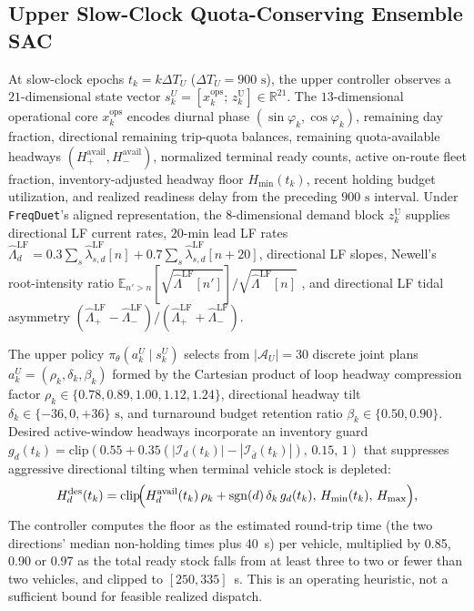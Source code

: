 \subsection{Upper Slow-Clock Quota-Conserving Ensemble SAC}
\label{sec:method_upper}

At slow-clock epochs $t_k = k \Delta T_U$ ($\Delta T_U = 900\text{ s}$), the upper controller observes a $21$-dimensional state vector $s^U_k = [x^{\mathrm{ops}}_k;\, z^{\mathrm{U}}_k] \in \mathbb{R}^{21}$. The $13$-dimensional operational core $x^{\mathrm{ops}}_k$ encodes diurnal phase $(\sin\varphi_k, \cos\varphi_k)$, remaining day fraction, directional remaining trip-quota balances, remaining quota-available headways $(H^{\mathrm{avail}}_+, H^{\mathrm{avail}}_-)$, normalized terminal ready counts, active on-route fleet fraction, inventory-adjusted headway floor $H_{\min}(t_k)$, recent holding budget utilization, and realized readiness delay from the preceding $900\text{ s}$ interval. Under \texttt{FreqDuet}'s aligned representation, the $8$-dimensional demand block $z^{\mathrm{U}}_k$ supplies directional LF current rates, $20\text{-min}$ lead LF rates $\hat{\Lambda}^{\mathrm{LF}}_d = 0.3\sum_s \hat{\lambda}^{\mathrm{LF}}_{s,d}[n] + 0.7\sum_s \hat{\lambda}^{\mathrm{LF}}_{s,d}[n+20]$, directional LF slopes, Newell's root-intensity ratio $\mathbb{E}_{n'>n}[\sqrt{\hat{\Lambda}^{\mathrm{LF}}[n']}]/\sqrt{\hat{\Lambda}^{\mathrm{LF}}[n]}$ \citep{newell1971dispatching}, and directional LF tidal asymmetry $(\hat{\Lambda}^{\mathrm{LF}}_+ - \hat{\Lambda}^{\mathrm{LF}}_-)/(\hat{\Lambda}^{\mathrm{LF}}_+ + \hat{\Lambda}^{\mathrm{LF}}_-)$.

The upper policy $\pi_\theta(a^U_k \mid s^U_k)$ selects from $|\mathcal{A}_U| = 30$ discrete joint plans $a^U_k = (\rho_k, \delta_k, \beta_k)$ formed by the Cartesian product of loop headway compression factor $\rho_k \in \{0.78, 0.89, 1.00, 1.12, 1.24\}$, directional headway tilt $\delta_k \in \{-36, 0, +36\}\text{ s}$, and turnaround budget retention ratio $\beta_k \in \{0.50, 0.90\}$. Desired active-window headways incorporate an inventory guard $g_d(t_k) = \mathrm{clip}(0.55 + 0.35(|\mathcal{I}_d(t_k)| - |\mathcal{I}_{\bar{d}}(t_k)|),\, 0.15,\, 1)$ that suppresses aggressive directional tilting when terminal vehicle stock is depleted:
\begin{equation}
  H^{\mathrm{des}}_d(t_k) = \mathrm{clip}\!\Bigl(H^{\mathrm{avail}}_d(t_k)\,\rho_k + \mathrm{sgn}(d)\,\delta_k\,g_d(t_k),\, H_{\min}(t_k),\, H_{\max}\Bigr),
  \label{eq:desired_headway}
\end{equation}
The controller computes the floor as the estimated round-trip time (the two directions' median non-holding times plus 40~s) per vehicle, multiplied by 0.85, 0.90 or 0.97 as the total ready stock falls from at least three to two or fewer than two vehicles, and clipped to $[250,335]$~s. This is an operating heuristic, not a sufficient bound for feasible realized dispatch.

